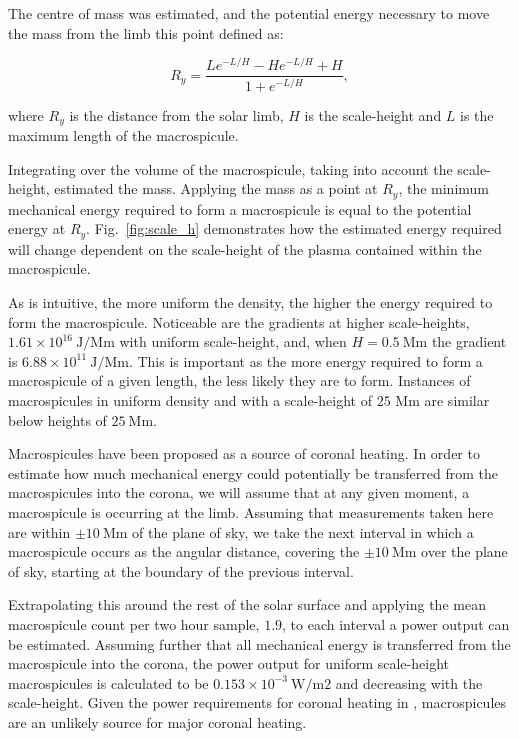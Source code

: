 The centre of mass was estimated, and the potential energy necessary to move the mass from the limb this point defined as:

\begin{equation}
R_y = \frac{Le^{-L/H} - He^{-L/H} + H}{1 + e^{-L/H}},
\end{equation} 

\noindent where $R_y$ is the distance from the solar limb, $H$ is the scale-height and $L$ is the maximum length of the macrospicule.

Integrating over the volume of the macrospicule, taking into account the scale-height, estimated the mass. Applying the mass as a point at $R_y$, the minimum mechanical energy required to form a macrospicule is equal to the potential energy at $R_y$. Fig.~\ref{fig:scale_h} demonstrates how the estimated energy required will change dependent on the scale-height of the plasma contained within the macrospicule.

As is intuitive, the more uniform the density, the higher the energy required to form the macrospicule. Noticeable are the gradients at higher scale-heights, $1.61 \times 10^{16}\ \textrm{J/Mm}$ with uniform scale-height, and, when $H = 0.5\ \textrm{Mm}$ the gradient is  $6.88 \times 10^{11}\ \textrm{J/Mm}$. This is important as the more energy required to form a macrospicule of a given length, the less likely they are to form. Instances of macrospicules in uniform density and with a scale-height of $25$ Mm are similar below heights of $25\ \textrm{Mm}$.

Macrospicules have been proposed as a source of coronal heating. In order to estimate how much mechanical energy could potentially be transferred from the macrospicules into the corona, we will assume that at any given moment, a macrospicule is occurring at the limb. Assuming that measurements taken here are within $\pm10\ \textrm{Mm}$ of the plane of sky, we take the next interval in which a macrospicule occurs as the angular distance, covering the $\pm10\ \textrm{Mm}$ over the plane of sky, starting at the boundary of the previous interval. 

Extrapolating this around the rest of the solar surface and applying the mean macrospicule count per two hour sample, $1.9$, to each interval a power output can be estimated. Assuming further that all mechanical energy is transferred from the macrospicule into the corona, the power output for uniform scale-height macrospicules is calculated to be $0.153 \times 10^{-3}\ \textrm{W/m{2}}$ and decreasing with the scale-height. Given the power requirements for coronal heating in \cite{AschwandenCHR2007}, macrospicules are an unlikely source for major coronal heating.


